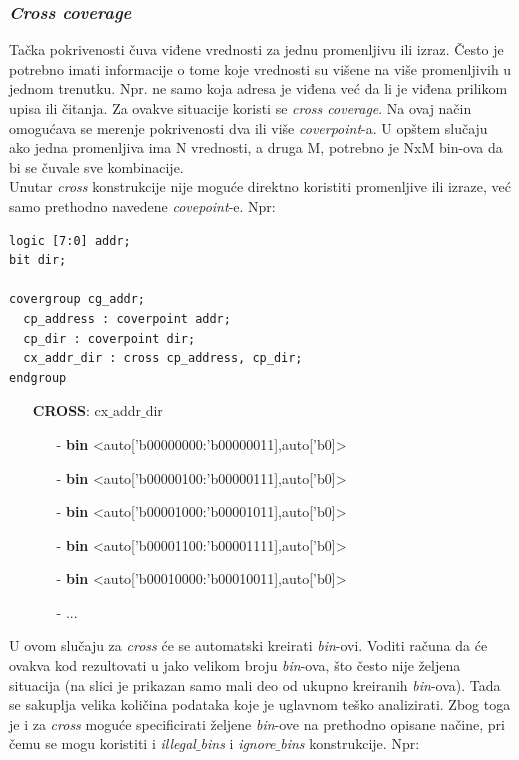 \subsubsection{\emph{Cross coverage}}

Tačka pokrivenosti čuva viđene vrednosti za jednu promenljivu ili izraz. Često
je potrebno imati informacije o tome koje vrednosti su višene na više
promenljivih u jednom trenutku. Npr. ne samo koja adresa je viđena već da li je
viđena prilikom upisa ili čitanja. Za ovakve situacije koristi se \emph{cross
  coverage}. Na ovaj način omogućava se merenje pokrivenosti dva ili više
\emph{coverpoint}-a. U opštem slučaju ako jedna promenljiva ima N vrednosti, a
druga M, potrebno je NxM bin-ova da bi se čuvale sve kombinacije.\\

Unutar \emph{cross} konstrukcije nije moguće direktno koristiti promenljive ili
izraze, već samo prethodno navedene \emph{covepoint}-e. Npr:

\begin{lstlisting}
logic [7:0] addr;
bit dir;

covergroup cg_addr;
  cp_address : coverpoint addr;
  cp_dir : coverpoint dir;
  cx_addr_dir : cross cp_address, cp_dir;
endgroup
\end{lstlisting}

\begin{itemize}
\item[] \textbf{CROSS}: cx\(\_\)addr\(\_\)dir
  \begin{itemize}
  \item[-] \textbf{bin} <auto['b00000000:'b00000011],auto['b0]>
  \item[-] \textbf{bin} <auto['b00000100:'b00000111],auto['b0]>
  \item[-] \textbf{bin} <auto['b00001000:'b00001011],auto['b0]>
  \item[-] \textbf{bin} <auto['b00001100:'b00001111],auto['b0]>
  \item[-] \textbf{bin} <auto['b00010000:'b00010011],auto['b0]>
  \item[-] ...
  \end{itemize}
\end{itemize}


U ovom slučaju za \emph{cross} će se automatski kreirati \emph{bin}-ovi. Voditi
računa da će ovakva kod rezultovati u jako velikom broju \emph{bin}-ova, što
često nije željena situacija (na slici je prikazan samo mali deo od ukupno
kreiranih \emph{bin}-ova). Tada se sakuplja velika količina podataka koje je
uglavnom teško analizirati. Zbog toga je i za \emph{cross} moguće specificirati
željene \emph{bin}-ove na prethodno opisane načine, pri čemu se mogu koristiti i
\emph{illegal\(\_\)bins} i \emph{ignore\(\_\)bins} konstrukcije. Npr:

